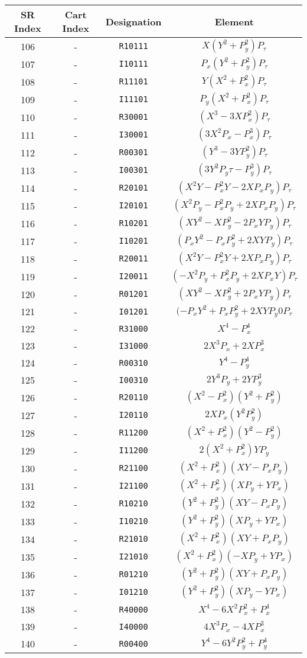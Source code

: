 {{\begin{center}
\newpage
\begin{tabular}{cccc}
SR Index&Cart Index&Designation&Element\\ \hline
  106&-&{\tt R10111}&$X(Y^2+P_y^2)P_{\tau}$\\
  107&-&{\tt I10111}&$P_x(Y^2+P_y^2)P_{\tau}$\\
  108&-&{\tt R11101}&$Y(X^2+P_x^2)P_{\tau}$\\
  109&-&{\tt I11101}&$P_y(X^2+P_x^2)P_{\tau}$\\
  110&-&{\tt R30001}&$(X^3-3XP_x^2)P_{\tau}$\\
  111&-&{\tt I30001}&$(3X^2P_x-P_x^3)P_{\tau}$\\
  112&-&{\tt R00301}&$(Y^3-3YP_y^2)P_{\tau}$\\
  113&-&{\tt I00301}&$(3Y^2P_y{\tau}-P_y^3)P_{\tau}$\\
  114&-&{\tt R20101}&$(X^2Y-P_x^2Y-2XP_xP_y)P_{\tau}$\\
  115&-&{\tt I20101}&$(X^2P_y-P_x^2P_y+2XP_xP_y)P_{\tau}$\\
  116&-&{\tt R10201}&$(XY^2-XP_y^2-2P_xYP_y)P_{\tau}$\\
  117&-&{\tt I10201}&$(P_xY^2-P_xP_y^2+2XYP_y)P_{\tau}$\\
  118&-&{\tt R20011}&$(X^2Y-P_x^2Y+2XP_xP_y)P_{\tau}$\\
  119&-&{\tt I20011}&$(-X^2P_y+P_x^2P_y+2XP_xY)P_{\tau}$\\
  120&-&{\tt R01201}&$(XY^2-XP_y^2+2P_xYP_y)P_{\tau}$\\
  121&-&{\tt I01201}&$(-P_xY^2+P_xP_y^2+2XYP_y0P_{\tau}$\\
  122&-&{\tt R31000}&$X^4-P_x^4$\\
  123&-&{\tt I31000}&$2X^3P_x+2XP_x^3$\\
  124&-&{\tt R00310}&$Y^4-P_y^4$\\
  125&-&{\tt I00310}&$2Y^3P_y+2YP_y^3$\\
  126&-&{\tt R20110}&$(X^2-P_x^2)(Y^2+P_y^2)$\\
  127&-&{\tt I20110}&$2XP_x(Y^2P_y^2)$\\
  128&-&{\tt R11200}&$(X^2+P_x^2)(Y^2-P_y^2)$\\
  129&-&{\tt I11200}&$2(X^2+P_x^2)YP_y$\\
  130&-&{\tt R21100}&$(X^2+P_x^2)(XY-P_xP_y)$\\
  131&-&{\tt I21100}&$(X^2+P_x^2)(XP_y+YP_x)$\\
  132&-&{\tt R10210}&$(Y^2+P_y^2)(XY-P_xP_y)$\\
  133&-&{\tt I10210}&$(Y^2+P_y^2)(XP_y+YP_x)$\\
  134&-&{\tt R21010}&$(X^2+P_x^2)(XY+P_xP_y)$\\
  135&-&{\tt I21010}&$(X^2+P_x^2)(-XP_y+YP_x)$\\
  136&-&{\tt R01210}&$(Y^2+P_y^2)(XY+P_xP_y)$\\
  137&-&{\tt I01210}&$(Y^2+P_y^2)(XP_y-YP_x)$\\
  138&-&{\tt R40000}&$X^4-6X^2P_x^2+P_x^4$\\
  139&-&{\tt I40000}&$4X^3P_x-4XP_x^3$\\
  140&-&{\tt R00400}&$Y^4-6Y^2P_y^2+P_y^4$
\end{tabular}



\end{center}}}
